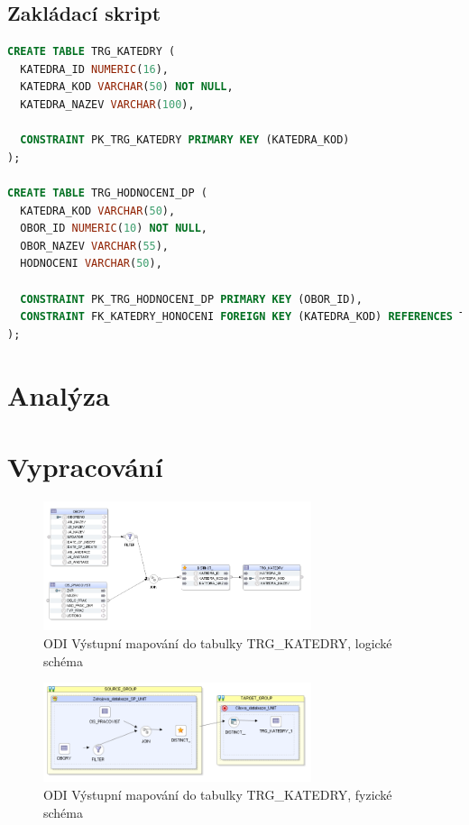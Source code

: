\subsection{Zakládací skript}

\begin{lstlisting}[language=sql]
CREATE TABLE TRG_KATEDRY (
  KATEDRA_ID NUMERIC(16),
  KATEDRA_KOD VARCHAR(50) NOT NULL,
  KATEDRA_NAZEV VARCHAR(100),

  CONSTRAINT PK_TRG_KATEDRY PRIMARY KEY (KATEDRA_KOD)
);

CREATE TABLE TRG_HODNOCENI_DP (
  KATEDRA_KOD VARCHAR(50),
  OBOR_ID NUMERIC(10) NOT NULL,
  OBOR_NAZEV VARCHAR(55),
  HODNOCENI VARCHAR(50),

  CONSTRAINT PK_TRG_HODNOCENI_DP PRIMARY KEY (OBOR_ID),
  CONSTRAINT FK_KATEDRY_HONOCENI FOREIGN KEY (KATEDRA_KOD) REFERENCES TRG_KATEDRY (KATEDRA_KOD)
);
\end{lstlisting}

\section{Analýza}

\section{Vypracování}

\begin{figure}[htb]
    \centering
    \includegraphics[width=0.7\textwidth]{graphs/odi-mapping-trg-katedry.png}
    \caption{ODI Výstupní mapování do tabulky TRG\_KATEDRY, logické schéma}
    \label{fig:odi-mapping-trg-katedry}
\end{figure}
\FloatBarrier

\begin{figure}[htb]
    \centering
    \includegraphics[width=0.7\textwidth]{graphs/odi-mapping-trg-katedry-physical.png}
    \caption{ODI Výstupní mapování do tabulky TRG\_KATEDRY, fyzické schéma}
    \label{fig:odi-mapping-trg-katedry-physical}
\end{figure}
\FloatBarrier


